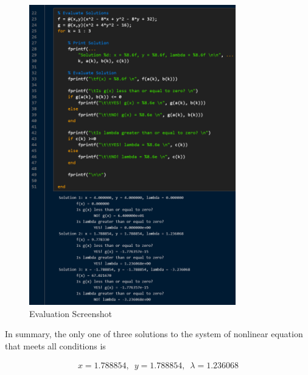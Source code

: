 \begin{figure}[h] \label{fig: matlab eval screenshot}
	\centering
	\includegraphics[width=0.8\textwidth]{./images/prob4_eval_screenshot.png}
	\caption{\MATLAB Evaluation Screenshot}
\end{figure}
\FloatBarrier

In summary, the only one of three solutions to the system of nonlinear equation that meets all conditions is

\begin{align*}
	x = \textrm{1.788854}, \,\,\, y = \textrm{1.788854}, \,\,\, \lambda = \textrm{1.236068}
\end{align*}

